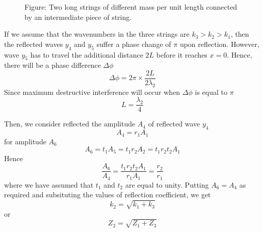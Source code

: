 \documentclass[../../../main.tex]{subfiles}
\begin{document}
\begin{figure}
    \centering
    \caption*{Figure: Two long strings of different mass per unit length connected by an intermediate piece of string.}
\end{figure}

If we assume that the wavenumbers in the three strings are $k_3 > k_2 > k_1$, then the reﬂected waves $y_4$ and $y_5$ suffer a phase change of $\pi$ upon reﬂection. However, wave $y_5$ has to travel the additional distance $2L$ before it reaches $x=0$. Hence, there will be a phase difference $\Delta \phi$
\begin{equation*}
    \Delta\phi=2\pi\times \frac{2L}{2\lambda_2}
\end{equation*}
Since maximum destructive interference will occur when $\Delta \phi$ is equal to $\pi$
\begin{equation*}
    L=\frac{\lambda_2}{4}
\end{equation*}

Then, we consider reflected the amplitude $A_4$ of reﬂected wave $y_4$
\begin{equation*}
    A_4=r_{1}A_1
\end{equation*}
for amplitude $A_6$
\begin{equation*}
    A_6=t_1A_5=t_1r_2A_2=t_1r_2t_2A_1
\end{equation*}
Hence
\begin{equation*}
    \frac{A_6}{A_4}=\frac{t_1r_2t_2A_1}{r_{1}A_1}=\frac{r_2}{r_1}
\end{equation*}
where we have assumed that $t_1$ and $t_2$ are equal to unity. Putting $A_6 = A_4$ as required and subsituting the values of reflection coefficient, we get
\begin{equation*}
    k_2=\sqrt{k_1+k_3}
\end{equation*}
or
\begin{equation*}
    Z_2=\sqrt{Z_1+Z_3}
\end{equation*}
\end{document}
